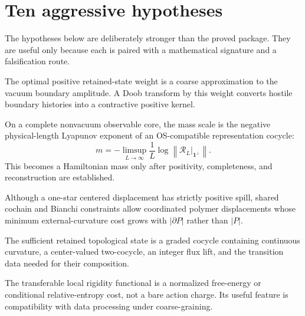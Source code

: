 \section{Ten aggressive hypotheses}

The hypotheses below are deliberately stronger than the proved package.  They
are useful only because each is paired with a mathematical signature and a
falsification route.

\begin{hypothesis}
The optimal positive retained-state weight is a coarse approximation to the
vacuum boundary amplitude.  A Doob transform by this weight converts hostile
boundary histories into a contractive positive kernel.
\end{hypothesis}

\begin{hypothesis}
On a complete nonvacuum observable core, the mass scale is the negative
physical-length Lyapunov exponent of an OS-compatible representation
cocycle:
\begin{equation}
 m=-\limsup_{L\to\infty}\frac1L
 \log\left\|\mathcal R_L\big|_{\mathbf 1^\perp}\right\|.
\end{equation}
This becomes a Hamiltonian mass only after positivity, completeness, and
reconstruction are established.
\end{hypothesis}

\begin{hypothesis}
Although a one-star centered displacement has strictly positive spill, shared
cochain and Bianchi constraints allow coordinated polymer displacements whose
minimum external-curvature cost grows with \(|\partial P|\) rather than
\(|P|\).
\end{hypothesis}

\begin{hypothesis}
The sufficient retained topological state is a graded cocycle containing
continuous curvature, a center-valued two-cocycle, an integer flux lift, and
the transition data needed for their composition.
\end{hypothesis}

\begin{hypothesis}
The transferable local rigidity functional is a normalized free-energy or
conditional relative-entropy cost, not a bare action charge.  Its useful
feature is compatibility with data processing under coarse-graining.
\end{hypothesis}

